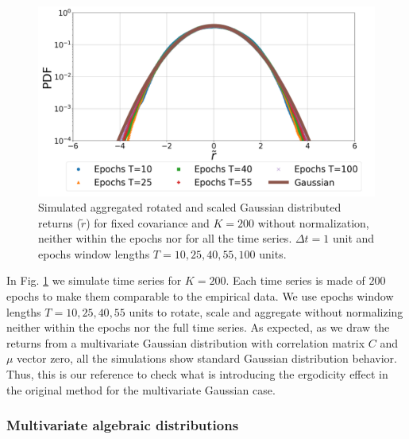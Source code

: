 \begin{figure}[htbp]
    \centering
    \includegraphics[width=0.6\columnwidth]
    {figures/06_epochs_sim_gauss_agg_ret_pairs_no_norm.png}
    \caption{Simulated aggregated rotated and scaled Gaussian distributed
             returns ($\tilde{r}$) for fixed covariance and $K=200$ without
             normalization, neither within the epochs nor for all the time
             series. $\Delta t = 1$ unit and epochs window  lengths
             $T=10, 25, 40, 55, 100$ units.}
    \label{fig:gauss_epochs_agg_ret_pairs_no_norm}
\end{figure}

In Fig. \ref{fig:gauss_epochs_agg_ret_pairs_no_norm} we simulate time series
for $K = 200$. Each time series is made of $200$ epochs to make them comparable
to the empirical data. We use epochs window lengths $T = 10, 25, 40, 55$ units
to rotate, scale and aggregate without normalizing neither within the epochs
nor the full time series. As expected, as we draw the returns from a
multivariate Gaussian distribution with correlation matrix $C$ and $\mu$ vector
zero, all the simulations show standard Gaussian distribution behavior. Thus,
this is our reference to check what is introducing the ergodicity effect in the
original method for the multivariate Gaussian case.

\subsubsection{Multivariate algebraic distributions}\label{subsubsec:alg_sim}

